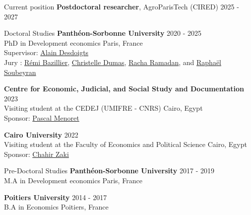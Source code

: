 \documentclass[
]{resume}
\begin{document}
\begin{small}
\begin{rSection}{Current position}
{\bfseries Postdoctoral researcher}, AgroParisTech (CIRED) \hfill {2025 - 2027} 
\end{rSection}
\vspace{0.2cm}

\begin{rSection}{Doctoral Studies}
{\bfseries Panth\'{e}on-Sorbonne University} \hfill {2020 - 2025} 
\\ PhD in Development economics  \hfill {Paris, France} \\ 
Supervisor: \href{https://scholar.google.com/citations?user=6c8QzJwAAAAJ&hl=fr}{Alain Desdoigts} \\
Jury : \href{https://scholar.google.com/citations?user=-IXkBZAAAAAJ&hl=fr}{Rémi Bazillier}, \href{https://scholar.google.com/citations?user=WtNVDgMAAAAJ&hl=fr}{Christelle Dumas}, \href{https://scholar.google.com/citations?user=OH-yKZQAAAAJ&hl=en}{Racha Ramadan}, and \href{https://scholar.google.fr/citations?user=Iv0Mq7wAAAAJ&hl=ru}{Raphaël Soubeyran}
\vspace{0.2cm}

{\bfseries Centre for Economic, Judicial, and Social Study and Documentation} \hfill {2023} \\
 Visiting student at the CEDEJ (UMIFRE - CNRS) \hfill {Cairo, Egypt} \\
 Sponsor: \href{https://shs.cairn.info/publications-de-pascal-menoret--42012?lang=fr}{Pascal Menoret}
\vspace{0.2cm}

{\bfseries Cairo University} \hfill {2022} \\
 Visiting student at the Faculty of Economics and Political Science \hfill {Cairo, Egypt} \\
  Sponsor: \href{https://scholar.google.com/citations?user=VtX_EgwAAAAJ&hl=en}{Chahir Zaki}
\end{rSection}
\vspace{0.2cm}

\begin{rSection}{Pre-Doctoral Studies}
{\bfseries Panth\'{e}on-Sorbonne University} \hfill {2017 - 2019} \\
M.A in Development economics \hfill {Paris, France}
\vspace{0.2cm}

{\bfseries Poitiers University} \hfill {2014 - 2017} \\
B.A in Economics \hfill {Poitiers, France}
\end{rSection}
\vspace{0.2cm}


\end{small}
\end{document}
